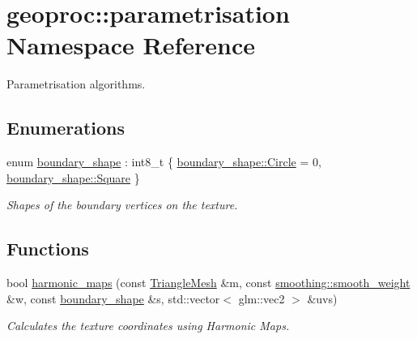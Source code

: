 \hypertarget{namespacegeoproc_1_1parametrisation}{}\section{geoproc\+:\+:parametrisation Namespace Reference}
\label{namespacegeoproc_1_1parametrisation}


Parametrisation algorithms.  


\subsection*{Enumerations}
\begin{DoxyCompactItemize}
\item 
enum \hyperlink{namespacegeoproc_1_1parametrisation_a7f001bf497830114e8aea2c884a948b7}{boundary\+\_\+shape} \+: int8\+\_\+t \{ \hyperlink{namespacegeoproc_1_1parametrisation_a7f001bf497830114e8aea2c884a948b7a30954d90085f6eaaf5817917fc5fecb3}{boundary\+\_\+shape\+::\+Circle} = 0, 
\hyperlink{namespacegeoproc_1_1parametrisation_a7f001bf497830114e8aea2c884a948b7aceb46ca115d05c51aa5a16a8867c3304}{boundary\+\_\+shape\+::\+Square}
 \}\begin{DoxyCompactList}\small\item\em Shapes of the boundary vertices on the texture. \end{DoxyCompactList}
\end{DoxyCompactItemize}
\subsection*{Functions}
\begin{DoxyCompactItemize}
\item 
bool \hyperlink{namespacegeoproc_1_1parametrisation_aa73e02d994e3ef3eba0fcfc5863c8416}{harmonic\+\_\+maps} (const \hyperlink{classgeoproc_1_1TriangleMesh}{Triangle\+Mesh} \&m, const \hyperlink{namespacegeoproc_1_1smoothing_a76e43f405426c150569712512de58028}{smoothing\+::smooth\+\_\+weight} \&w, const \hyperlink{namespacegeoproc_1_1parametrisation_a7f001bf497830114e8aea2c884a948b7}{boundary\+\_\+shape} \&s, std\+::vector$<$ glm\+::vec2 $>$ \&uvs)
\begin{DoxyCompactList}\small\item\em Calculates the texture coordinates using Harmonic Maps. \end{DoxyCompactList}\end{DoxyCompactItemize}


